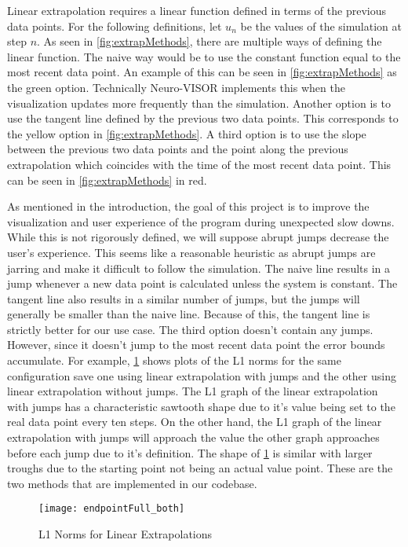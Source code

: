 Linear extrapolation requires a linear function defined in terms of the previous data points.
For the following definitions, let $u_n$ be the values of the simulation at step $n$.
As seen in \cref{fig:extrapMethods}, there are multiple ways of defining the linear function.
The naive way would be to use the constant function equal to the most recent data point.
An example of this can be seen in \cref{fig:extrapMethods} as the green option.
Technically Neuro-VISOR implements this when the visualization updates more frequently than the simulation.
Another option is to use the tangent line defined by the previous two data points.
This corresponds to the yellow option in \cref{fig:extrapMethods}.
A third option is to use the slope between the previous two data points and the point along the previous extrapolation which coincides with the time of the most recent data point.
This can be seen in \cref{fig:extrapMethods} in red.

As mentioned in the introduction, the goal of this project is to improve the visualization and user experience of the program during unexpected slow downs.
While this is not rigorously defined, we will suppose abrupt jumps decrease the user's experience.
This seems like a reasonable heuristic as abrupt jumps are jarring and make it difficult to follow the simulation.
The naive line results in a jump whenever a new data point is calculated unless the system is constant.
The tangent line also results in a similar number of jumps, but the jumps will generally be smaller than the naive line.
Because of this, the tangent line is strictly better for our use case.
The third option doesn't contain any jumps.
However, since it doesn't jump to the most recent data point the error bounds accumulate.
For example, \cref{fig:l1} shows plots of the L1 norms for the same configuration save one using linear extrapolation with jumps and the other using linear extrapolation without jumps.
The L1 graph of the linear extrapolation with jumps has a characteristic sawtooth shape due to it's value being set to the real data point every ten steps.
On the other hand, the L1 graph of the linear extrapolation with jumps will approach the value the other graph approaches before each jump due to it's definition.
The shape of \cref{fig:l1} is similar with larger troughs due to the starting point not being an actual value point.
These are the two methods that are implemented in our codebase.

\begin{figure}[H]
    \centering
    \texttt{[image: endpointFull\_both]}
    \caption{L1 Norms for Linear Extrapolations}%
    \label{fig:l1}
\end{figure}


